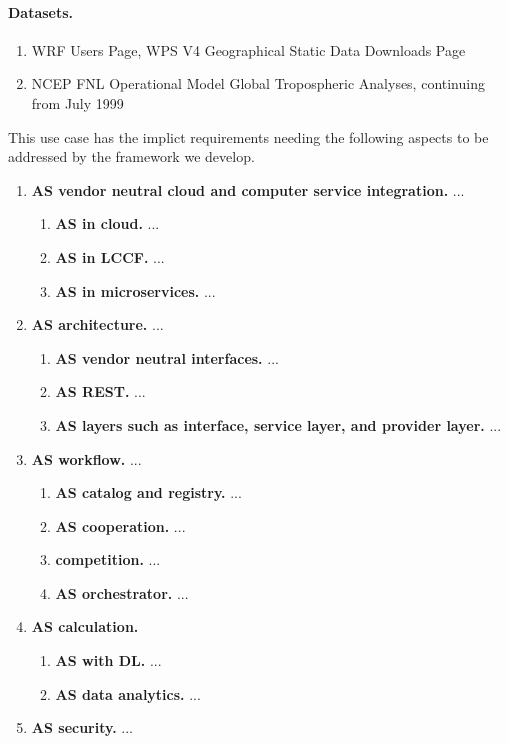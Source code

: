 \paragraph*{Datasets.}

\begin{enumerate}
  
\item WRF Users Page, WPS V4 Geographical Static Data Downloads Page \cite{wrf-data}

\item NCEP FNL Operational Model Global Tropospheric Analyses, continuing
from July 1999 \cite{cisl_rda_ds083.2}

\end{enumerate}


This use case has the implict requirements needing the following
aspects to be addressed by the framework we develop.

\begin{enumerate}

\item{\bf AS vendor neutral cloud and computer service integration.} ...

  \begin{enumerate}
  \item {\bf AS in cloud.} ...
  \item {\bf AS in LCCF.} ...
  \item {\bf AS in microservices.} ...
  \end{enumerate}

\item{\bf AS architecture.} ...

  \begin{enumerate}
  \item{\bf AS vendor neutral interfaces.} ...
  \item{\bf AS REST.} ...
  \item{\bf AS layers such as interface, service layer, and provider layer.} ...
  \end{enumerate}

\item{\bf AS workflow.} ...

  \begin{enumerate}
  \item{\bf AS catalog and registry.} ...
  \item{\bf AS cooperation.} ...
  \item{\bf competition.} ...
  \item{\bf AS orchestrator.} ...
  \end{enumerate}


\item{\bf AS calculation.}

  \begin{enumerate}
  \item{\bf AS with DL.} ...
  \item{\bf AS data analytics.} ...
  \end{enumerate}

\item{\bf AS security.} ...

\end{enumerate}


